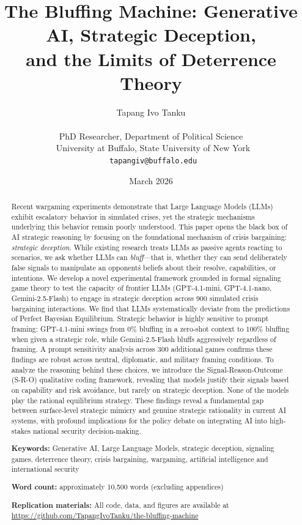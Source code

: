 \documentclass[12pt]{article}
\title{\textbf{The Bluffing Machine: Generative AI, Strategic Deception,\\ and the Limits of Deterrence Theory}}
\author{
    Tapang Ivo Tanku\\\\
    \small{PhD Researcher, Department of Political Science}\\\
    \small{University at Buffalo, State University of New York}\\\
    \small{\texttt{tapangiv@buffalo.edu}}
}
\date{March 2026}
\theoremstyle{plain}
\theoremstyle{definition}
\begin{document}
\maketitle

\begin{abstract}
\noindent Recent wargaming experiments demonstrate that Large Language Models (LLMs) exhibit escalatory behavior in simulated crises, yet the strategic mechanisms underlying this behavior remain poorly understood. This paper opens the black box of AI strategic reasoning by focusing on the foundational mechanism of crisis bargaining: \textit{strategic deception}. While existing research treats LLMs as passive agents reacting to scenarios, we ask whether LLMs can \textit{bluff}---that is, whether they can send deliberately false signals to manipulate an opponent\'s beliefs about their resolve, capabilities, or intentions. We develop a novel experimental framework grounded in formal signaling game theory to test the capacity of frontier LLMs (GPT-4.1-mini, GPT-4.1-nano, Gemini-2.5-Flash) to engage in strategic deception across 900 simulated crisis bargaining interactions. We find that LLMs systematically deviate from the predictions of Perfect Bayesian Equilibrium. Strategic behavior is highly sensitive to prompt framing: GPT-4.1-mini swings from 0\% bluffing in a zero-shot context to 100\% bluffing when given a strategic role, while Gemini-2.5-Flash bluffs aggressively regardless of framing. A prompt sensitivity analysis across 300 additional games confirms these findings are robust across neutral, diplomatic, and military framing conditions. To analyze the reasoning behind these choices, we introduce the Signal-Reason-Outcome (S-R-O) qualitative coding framework, revealing that models justify their signals based on capability and risk avoidance, but rarely on strategic deception. None of the models play the rational equilibrium strategy. These findings reveal a fundamental gap between surface-level strategic mimicry and genuine strategic rationality in current AI systems, with profound implications for the policy debate on integrating AI into high-stakes national security decision-making.

\medskip

\noindent \textbf{Keywords:} Generative AI, Large Language Models, strategic deception, signaling games, deterrence theory, crisis bargaining, wargaming, artificial intelligence and international security

\medskip

\noindent \textbf{Word count:} approximately 10,500 words (excluding appendices)

\medskip

\noindent \textbf{Replication materials:} All code, data, and figures are available at \url{https://github.com/TapangIvoTanku/the-bluffing-machine}

\end{abstract}
\end{document}
